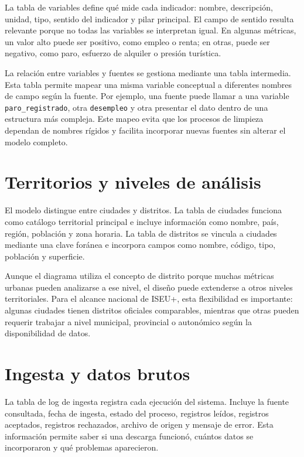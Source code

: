 La tabla de variables define qué mide cada indicador: nombre, descripción, unidad, tipo, sentido del indicador y pilar principal. El campo de sentido resulta relevante porque no todas las variables se interpretan igual. En algunas métricas, un valor alto puede ser positivo, como empleo o renta; en otras, puede ser negativo, como paro, esfuerzo de alquiler o presión turística.

La relación entre variables y fuentes se gestiona mediante una tabla intermedia. Esta tabla permite mapear una misma variable conceptual a diferentes nombres de campo según la fuente. Por ejemplo, una fuente puede llamar a una variable \texttt{paro\_registrado}, otra \texttt{desempleo} y otra presentar el dato dentro de una estructura más compleja. Este mapeo evita que los procesos de limpieza dependan de nombres rígidos y facilita incorporar nuevas fuentes sin alterar el modelo completo.

\section{Territorios y niveles de análisis}

El modelo distingue entre ciudades y distritos. La tabla de ciudades funciona como catálogo territorial principal e incluye información como nombre, país, región, población y zona horaria. La tabla de distritos se vincula a ciudades mediante una clave foránea e incorpora campos como nombre, código, tipo, población y superficie.

Aunque el diagrama utiliza el concepto de distrito porque muchas métricas urbanas pueden analizarse a ese nivel, el diseño puede extenderse a otros niveles territoriales. Para el alcance nacional de ISEU+, esta flexibilidad es importante: algunas ciudades tienen distritos oficiales comparables, mientras que otras pueden requerir trabajar a nivel municipal, provincial o autonómico según la disponibilidad de datos.

\section{Ingesta y datos brutos}

La tabla de log de ingesta registra cada ejecución del sistema. Incluye la fuente consultada, fecha de ingesta, estado del proceso, registros leídos, registros aceptados, registros rechazados, archivo de origen y mensaje de error. Esta información permite saber si una descarga funcionó, cuántos datos se incorporaron y qué problemas aparecieron.

